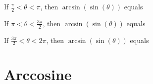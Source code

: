 \documentclass{ximera}
\begin{document}
\begin{question}


If $\frac{\pi}{2} < \theta < \pi$, then $\arcsin(\sin(\theta))$ equals

\begin{multipleChoice}
\choice {$\theta$}
\choice[correct] {$\pi - \theta$}
\choice {$\pi + \theta$}
\choice {$\theta - 2\pi$}
\end{multipleChoice}

\end{question}






\begin{question}


If $\pi < \theta < \frac{3\pi}{2}$, then $\arcsin(\sin(\theta))$ equals

\begin{multipleChoice}
\choice {$\theta$}
\choice[correct] {$\pi - \theta$}
\choice {$\pi + \theta$}
\choice {$\theta - 2\pi$}
\end{multipleChoice}

\end{question}






\begin{question}


If $\frac{3\pi}{2} < \theta < 2\pi$, then $\arcsin(\sin(\theta))$ equals

\begin{multipleChoice}
\choice {$\theta$}
\choice {$\pi - \theta$}
\choice {$\pi + \theta$}
\choice[correct] {$\theta - 2\pi$}
\end{multipleChoice}

\end{question}


























\section{Arccosine}
\end{document}
